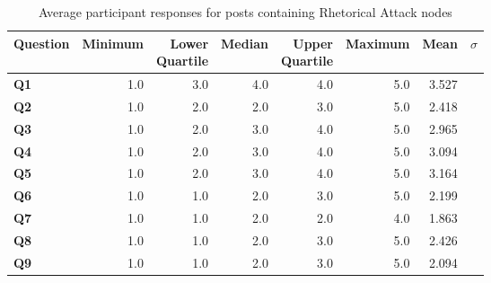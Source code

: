 \begin{table}
\centering
\caption{Average participant responses for posts containing Rhetorical Attack nodes}
\label{table:perception:rhetorical-attack-average}
\begin{tabular}{ l | r | r | r | r | r | r | r}
\textbf{Question} & \textbf{Minimum} & \pbox{2cm}{\textbf{Lower}\\ \textbf{Quartile}} & \textbf{Median} & \pbox{2cm}{\textbf{Upper}\\ \textbf{Quartile}} & \textbf{Maximum} & \textbf{Mean} & \textbf{$\sigma$}\\
\hline
\textbf{Q1} &  1.0 & 3.0 & 4.0 & 4.0 & 5.0 & 3.527 &  \\
\hline
\textbf{Q2} &  1.0 & 2.0 & 2.0 & 3.0 & 5.0 & 2.418 &  \\
\hline
\textbf{Q3} &  1.0 & 2.0 & 3.0 & 4.0 & 5.0 & 2.965 &  \\
\hline
\textbf{Q4} &  1.0 & 2.0 & 3.0 & 4.0 & 5.0 & 3.094 &  \\
\hline
\textbf{Q5} &  1.0 & 2.0 & 3.0 & 4.0 & 5.0 & 3.164 &  \\
\hline
\textbf{Q6} &  1.0 & 1.0 & 2.0 & 3.0 & 5.0 & 2.199 &  \\
\hline
\textbf{Q7} &  1.0 & 1.0 & 2.0 & 2.0 & 4.0 & 1.863 &  \\
\hline
\textbf{Q8} &  1.0 & 1.0 & 2.0 & 3.0 & 5.0 & 2.426 &  \\
\hline
\textbf{Q9} &  1.0 & 1.0 & 2.0 & 3.0 & 5.0 & 2.094 &  \\
\end{tabular}
\end{table}




